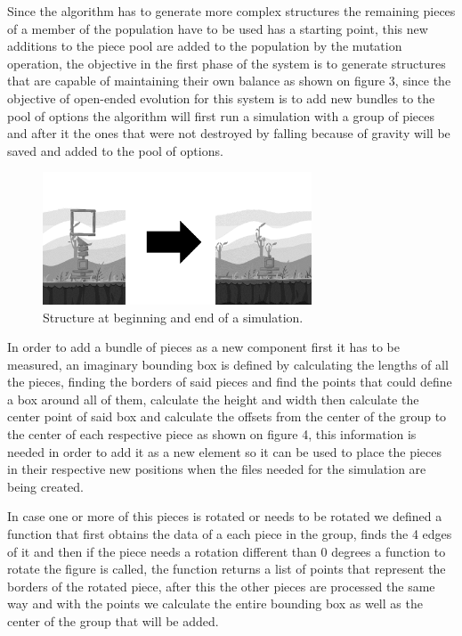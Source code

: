 \documentclass[graybox]{svmult}
\begin{document}
Since the algorithm has to generate more complex structures the remaining pieces of a member of the population have to be used has a starting point, this new additions to the piece pool are added to the population by the mutation operation, the objective in the first phase of the system is to generate structures that are capable of maintaining their own balance as shown on figure 3, since the objective of open-ended evolution for this system is to add new bundles to the pool of options the algorithm will first run a simulation with a group of pieces and after it the ones that were not destroyed by falling because of gravity will be saved and added to the pool of options.

\begin{figure}[htbp]
\centerline{\includegraphics[width=80mm]{Images/simulation_bef_aft_example.png}}
\caption{Structure at beginning and end of a simulation.}
\label{fig}
\end{figure}

In order to add a bundle of pieces as a new component first it has to be measured, an imaginary bounding box is defined by calculating the lengths of all the pieces, finding the borders of said pieces and find the points that could define a box around all of them, calculate the height and width then calculate the center point of said box and calculate the offsets from the center of the group to the center of each respective piece as shown on figure 4, this information is needed in order to add it as a new element so it can be used to place the pieces in their respective new positions when the files needed for the simulation are being created.

In case one or more of this pieces is rotated or needs to be rotated we defined a function that first obtains the data of a each piece in the group, finds the 4 edges of it and then if the piece needs a rotation different than 0 degrees a function to rotate the figure is called, the function returns a list of points that represent the borders of the rotated piece, after this the other pieces are processed the same way and with the points we calculate the entire bounding box as well as the center of the group that will be added.
\end{document}
